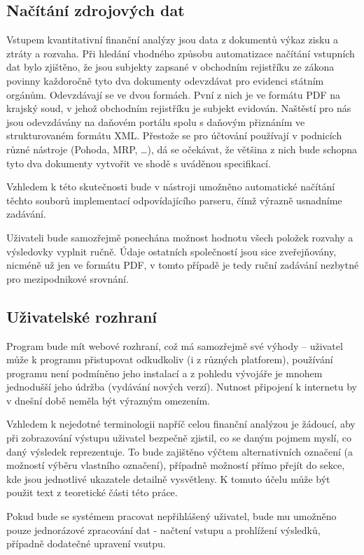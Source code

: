\subsection{Načítání zdrojových dat}
Vstupem kvantitativní finanční analýzy jsou data z dokumentů výkaz zisku a ztráty a rozvaha. Při hledání vhodného způsobu automatizace načítání vstupních dat bylo zjištěno, že jsou subjekty zapsané v obchodním rejistříku ze zákona povinny každoročně tyto dva dokumenty odevzdávat pro evidenci státním orgánům. 
Odevzdávají se ve dvou formách. Pvní z nich je ve formátu PDF na krajský soud, v jehož obchodním rejistříku je subjekt evidován. Naštěstí pro nás jsou odevzdávány na daňovém portálu spolu s daňovým přiznáním ve strukturovaném formátu XML. Přestože se pro účtování používají v podnicích různé nástroje (Pohoda, MRP, \dots), dá se očekávat, že většina z nich bude schopna tyto dva dokumenty vytvořit ve shodě s uváděnou specifikací.

Vzhledem k této skutečnosti bude v nástroji umožněno automatické načítání těchto souborů implementací odpovídajícího parseru,  čímž výrazně usnadníme zadávání.

Uživateli bude samozřejmě ponechána možnost hodnotu všech položek rozvahy a výsledovky vyplnit ručně. Údaje ostatních společností jsou sice zveřejňovány, nicméně už jen ve formátu PDF, v tomto případě je tedy ruční zadávání nezbytné pro mezipodnikové srovnání.

\subsection{Uživatelské rozhraní}
Program bude mít webové rozhraní, což má samozřejmě své výhody -- uživatel může k programu přistupovat odkudkoliv (i z různých platforem), používání programu není podmíněno jeho instalací a z pohledu vývojáře je mnohem jednodušší jeho údržba (vydávání nových verzí). Nutnost připojení k internetu by v dnešní době neměla být výrazným omezením.

Vzhledem k nejedotné terminologii napříč celou finanční analýzou je žádoucí, aby při zobrazování výstupu uživatel bezpečně zjistil, co se daným pojmem myslí, co daný výsledek reprezentuje. To bude zajištěno výčtem alternativních označení (a možností výběru vlastního označení), případně možností přímo přejít do sekce, kde jsou jednotlivé ukazatele detailně vysvětleny. K tomuto účelu může být použit text z teoretické části této práce.

Pokud bude se systémem pracovat nepřihlášený uživatel, bude mu umožněno pouze jednorázové zpracování dat - načtení vstupu a prohlížení výsledků, případně dodatečné upravení vsutpu.

